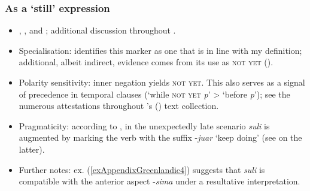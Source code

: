 \subsubsection{As a \lq{}still\rq{ }expression}
\begin{itemize}
	\item \textcite[84]{Bergsland1955}, \textcite[128]{Bjornum2012}, \textcite[23]{Fortescue1984} and \textcite[90]{FortescueEtAl1984}; additional discussion throughout \textcite{vanBaar1997}.
	\item Specialisation: \textcite{vanBaar1997} identifies this marker as one that is in line with my definition; additional, albeit indirect, evidence comes from its use as \textsc{not yet} ().
	\item Polarity sensitivity: inner negation yields \textsc{not yet}. This also serves as a signal of precedence in temporal clauses (\lq while \textsc{not yet} \textit{p}' > \lq before \textit{p}'); see the numerous attestations throughout \citeauthor{BittnerTexts}'s (\citeyear{BittnerTexts}) text collection.
	\item Pragmaticity: according to \textcite[76, 103]{vanBaar1997}, in the unexpectedly late scenario \textit{suli} is augmented by marking the verb with the suffix \mbox{-\textit{juar}} \lq keep doing' (see \cite[281–282]{Fortescue1984} on the latter).
	\item Further notes: ex. (\ref{exAppendixGreenlandic4}) suggests that \textit{suli} is compatible with the anterior aspect \mbox{-\textit{sima}} under a resultative interpretation. 
\end{itemize}
